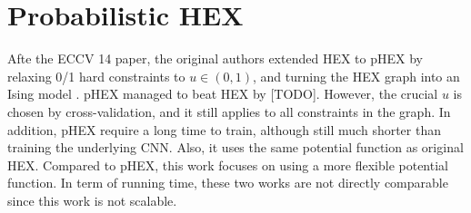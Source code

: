 \documentclass[11pt,a4paper]{article}
\begin{document}
\section{Probabilistic HEX}

Afte the ECCV 14 paper, the original authors extended HEX to pHEX by relaxing 0/1 hard constraints to $u\in(0,1)$, and turning the HEX graph into an Ising model \cite{ding2015probabilistic}. pHEX managed to beat HEX by [TODO]. However, the crucial $u$ is chosen by cross-validation, and it still applies to all constraints in the graph. In addition, pHEX require a long time to train, although still much shorter than training the underlying CNN. Also, it uses the same potential function as original HEX. Compared to pHEX, this work focuses on using a more flexible potential function. In term of running time, these two works are not directly comparable since this work is not scalable.

\clearpage


\end{document}
